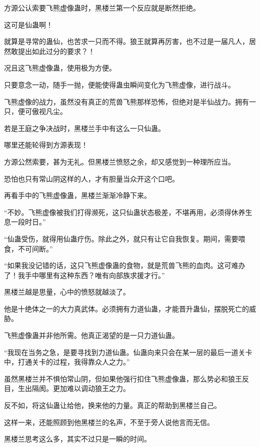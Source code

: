 
\begin{this_body}

方源公认索要飞熊虚像蛊时，黑楼兰第一个反应就是断然拒绝。

这可是仙蛊啊！

就算是寻常的蛊仙，也苦求一只而不得。狼王就算再厉害，也不过是一届凡人，居然敢提出如此过分的要求？！

况且这飞熊虚像蛊，使用极为方便。

只要意念一动，随手一抛，便能使得蛊虫瞬间变化为飞熊虚像，进行战斗。

飞熊虚像的战力，虽然没有真正的荒兽飞熊那样恐怖，但绝对是半仙战力。拥有一只，便可傲视凡尘。

若是王庭之争决战时，黑楼兰手中有这么一只仙蛊。

哪里还能轮得到方源表现！

方源公然索要，甚为无礼。但黑楼兰愤怒之余，却又感觉到一种理所应当。

恐怕也只有常山阴这样的人，才有胆量当众开这个口吧。

再看手中的飞熊虚像蛊，黑楼兰渐渐冷静下来。

“不妙。飞熊虚像被我们打得濒死，这只仙蛊状态极差，不堪再用，必须得休养生息一段时日。”

“仙蛊受伤，就得用仙蛊疗伤。除此之外，就只有让它自我恢复。期间，需要喂食，不可间断。”

“如果我没记错的话，这只飞熊虚像蛊的食物，就是荒兽飞熊的血肉。这可难办了！我手中哪里有这种东西？唯有向部族求援才行。”

黑楼兰越是思量，心中的愤怒就越淡了。

他是十绝体之一的大力真武体。必须拥有力道仙蛊，才能晋升蛊仙，摆脱死亡的威胁。

飞熊虚像蛊并非他所需。他真正渴望的是一只力道仙蛊。

“我现在当务之急，是要寻找到力道仙蛊。仙蛊向来只会在某一层的最后一道关卡中，打通关卡的过程，我得靠众人之力。”

虽然黑楼兰并不惧怕常山阴，但如果他强行扣住飞熊虚像蛊，那么势必和狼王反目，生出隔阂。更加难以调动狼王之力。

反不如，将这仙蛊让给他，换来他的力量。真正的帮助到黑楼兰自己。

这样一来，还能照顾到他黑楼兰的名声，不至于旁人说他言而无信。

黑楼兰思考这么多，其实不过只是一瞬的时间。


\end{this_body}
